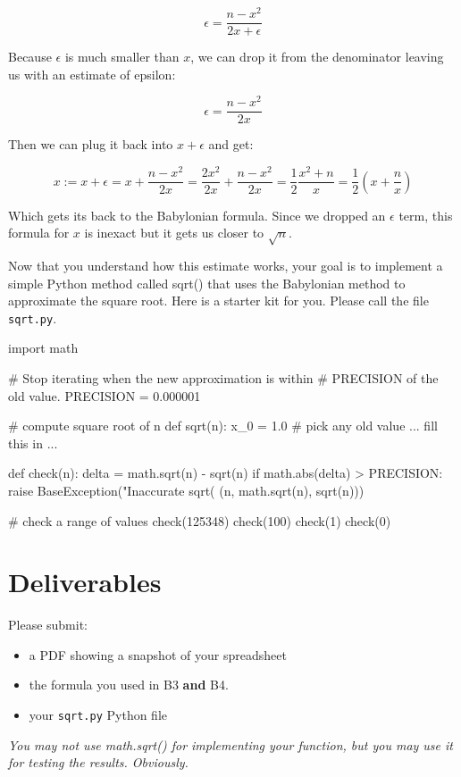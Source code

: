 \begin{fullwidth}
\[
\epsilon = \frac{n - x^2}{2x + \epsilon}
\]

Because $\epsilon$ is much smaller than $x$, we can drop it from the denominator leaving us with an estimate of epsilon:

\[
\epsilon = \frac{n - x^2}{2x}
\]

Then we can plug it back into $x + \epsilon$ and get:

\[
x := x + \epsilon = x + \frac{n - x^2}{2x} = \frac{2x^2}{2x} + \frac{n - x^2}{2x} = \frac{1}{2}\frac{x^2 + n}{x} = \frac{1}{2}(x + \frac{n}{x})
\]

Which gets its back to the Babylonian formula. Since we dropped an $\epsilon$ term, this formula for $x$ is inexact but it gets us closer to $\sqrt{n}$.


Now that you understand how this estimate works, your goal is to implement a simple Python method called sqrt() that uses the Babylonian method to approximate the square root. Here is a starter kit for you. Please call the file {\tt sqrt.py}.

\begin{pyverbatim}
import math

# Stop iterating when the new approximation is within
# PRECISION of the old value.
PRECISION = 0.000001

# compute square root of n
def sqrt(n):
    x_0 = 1.0 # pick any old value
    ... fill this in ...

def check(n):
    delta = math.sqrt(n) - sqrt(n)
    if math.abs(delta) > PRECISION:
        raise BaseException("Inaccurate sqrt(%
            (n, math.sqrt(n), sqrt(n)))

# check a range of values
check(125348)
check(100)
check(1)
check(0)
\end{pyverbatim}

\section{Deliverables}

Please submit:

\begin{itemize}
\item a PDF showing a snapshot of your spreadsheet
\item the formula you used in B3 {\bf and} B4.
\item your {\tt sqrt.py} Python file
\end{itemize}

{\em You may not use math.sqrt() for implementing your function, but you may use it for testing the results.  Obviously.}

\end{fullwidth}
